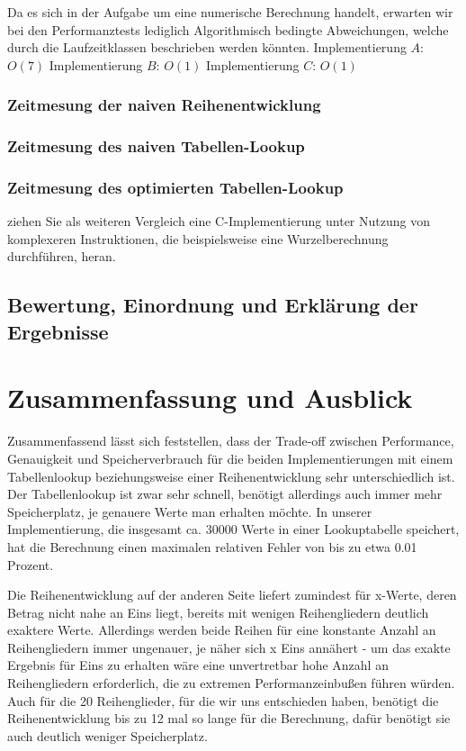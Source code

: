 \documentclass[course=erap] {aspdoc}
\begin{document}
    Da es sich in der Aufgabe um eine numerische Berechnung handelt, erwarten wir bei den Performanztests lediglich Algorithmisch bedingte Abweichungen, welche durch die Laufzeitklassen beschrieben werden könnten.
    Implementierung $A$: $O(7)$
    Implementierung $B$: $O(1)$
    Implementierung $C$: $O(1)$

    \subsubsection{Zeitmesung der naiven Reihenentwicklung}

    \subsubsection{Zeitmesung des naiven Tabellen-Lookup}

    \subsubsection{Zeitmesung des optimierten Tabellen-Lookup}
    ziehen Sie als weiteren Vergleich eine C-Implementierung unter Nutzung von komplexeren Instruktionen, die beispielsweise eine Wurzelberechnung durchführen, heran.

    \subsection{Bewertung, Einordnung und Erklärung der Ergebnisse}


    \section{Zusammenfassung und Ausblick}

    Zusammenfassend lässt sich feststellen, dass der Trade-off zwischen Performance, Genauigkeit und Speicherverbrauch für die beiden Implementierungen mit einem Tabellenlookup beziehungsweise einer Reihenentwicklung sehr unterschiedlich ist. Der Tabellenlookup ist zwar sehr schnell, benötigt allerdings auch immer mehr Speicherplatz, je genauere Werte man erhalten möchte. In unserer Implementierung, die insgesamt ca. 30000 Werte in einer Lookuptabelle speichert, hat die Berechnung einen maximalen relativen Fehler von bis zu etwa 0.01 Prozent. 
    
    Die Reihenentwicklung auf der anderen Seite liefert zumindest für x-Werte, deren Betrag nicht nahe an Eins liegt, bereits mit wenigen Reihengliedern deutlich exaktere Werte. Allerdings werden beide Reihen für eine konstante Anzahl an Reihengliedern immer ungenauer, je näher sich x Eins annähert - um das exakte Ergebnis für Eins zu erhalten wäre eine unvertretbar hohe Anzahl an Reihengliedern erforderlich, die zu extremen Performanzeinbußen führen würden.
    Auch für die 20 Reihenglieder, für die wir uns entschieden haben, benötigt die Reihenentwicklung bis zu 12 mal so lange für die Berechnung, dafür benötigt sie auch deutlich weniger Speicherplatz. 
\end{document}
